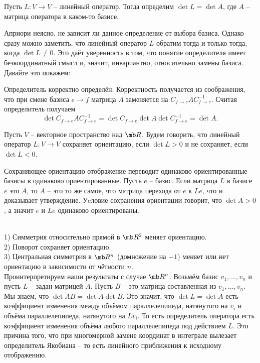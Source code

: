 \dfn Пусть $L\colon V \to V$ -- линейный оператор. Тогда определим $\det L=\det A$, где $A$ -- матрица оператора в каком-то базисе.
\edfn

Априори неясно, не зависит ли данное определение от выбора базиса. Однако сразу можно заметить, что линейный оператор $L$ обратим тогда и только тогда, когда $\det L \neq 0$. Это даёт уверенность в том, что понятие определителя имеет безкоординатный смысл и, значит, инвариантно, относительно замены базиса. Давайте это покажем:

\utv Определитель корректно определён.
\proof Корректность получается из соображения, что при смене базиса $e\to f$ матрица $A$ заменяется на $C_{f\to e}A C_{f \to e}^{-1}$. Считая определитель получаем
$$\det C_{f\to e}A C_{f \to e}^{-1}= \det C_{f\to e} \det A \det C_{f\to e}^{-1}= \det A.$$
\endproof
\eutv



\dfn Пусть $V$ -- векторное пространство над $\mb R$. Будем говорить, что линейный оператор $L\colon V \to V$ сохраняет ориентацию, если $\det L>0$ и не сохраняет, если $\det L<0$.
\edfn

\lm Сохраняющее ориентацию отображение переводит одинаково ориентированные базисы в одинаково ориентированные.
\proof Пусть $e$ -- базис. Если матрица $L$  в базисе $e$ это $A$, то $A$ -- это то же самое, что матрица перехода от $e$ к $Le$, что и доказывает утверждение. Уcловие сохранения ориентации говорит, что $\det A > 0$, а значит $e$ и $Le$ одинаково ориентированы.
\endproof
\elm

\exm\\
1) Симметрия относительно прямой в $\mb R^2$ меняет ориентацию.\\
2) Поворот сохраняет ориентацию.\\
3) Центральная симметрия в $\mb R^n$ (домножение на $-1$) меняет или нет ориентацию в зависимости  от чётности $n$.\\





Проинтерпретируем наши результаты с случае $\mb R^n$. Возьмём базис $v_1,\dots,v_n$ и пусть $L$ -- задан матрицей $A$. Пусть $B$ -- это матрица составленная из $v_1,\dots,v_n$. Мы знаем, что $\det AB= \det A \det B$. Это значит, что $\det L= \det A$ есть коэффициент изменения между объёмом параллелепипеда, натянутого на $v_i$ и объёма параллелепипеда, натянутого на $Lv_i$. То есть определитель оператора есть коэффициент изменения объёма любого параллелепипеда под действием $L$. Это причина того, что при многомерной замене координат в интеграле вылезает определитель Якобиана -- то есть линейного приближения к исходному отображению.

